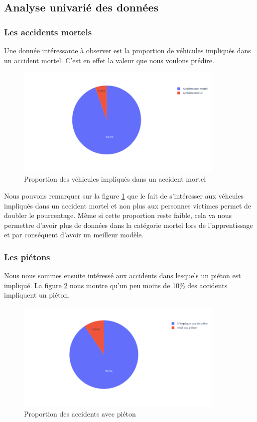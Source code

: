 \documentclass{article}
\begin{document}
    \subsection{Analyse univarié des données}
    \subsubsection{Les accidents mortels}
    Une donnée intéressante à observer est la proportion de véhicules impliqués dans un accident 
    mortel. C'est en effet la valeur que nous voulons prédire.

    \begin{figure}[ht]
        \centering
        \includegraphics[width=10cm]{./img/grav2.png}
        \caption{Proportion des véhicules impliqués dans un accident mortel}
        \label{fig:fig_acc_mortel}
    \end{figure}

    Nous pouvons remarquer sur la figure \ref{fig:fig_acc_mortel} que le fait de s'intéresser 
    aux véhcules impliqués dans un accident mortel et non plus aux personnes victimes permet 
    de doubler le pourcentage. Même si cette proportion reste faible, cela va nous permettre 
    d'avoir plus de données dans la catégorie mortel lors de l'apprentissage et par conséquent 
    d'avoir un meilleur modèle.

    \subsubsection{Les piétons}
    Nous nous sommes ensuite intéressé aux accidents dans lesquels un piéton est impliqué. 
    La figure \ref{fig:fig_acc_pieton} nous montre qu'un peu moins de 10\% des accidents impliquent 
    un piéton.

    \begin{figure}[ht]
        \centering
        \includegraphics[width=10cm]{./img/pieton.png}
        \caption{Proportion des accidents avec piéton}
        \label{fig:fig_acc_pieton}
    \end{figure}
\end{document}
